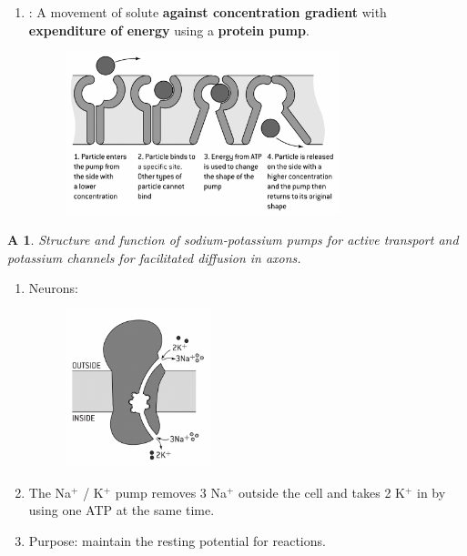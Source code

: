 \documentclass[12pt, a4paper]{article}
\newtheorem{app}{A}[subsection]
\begin{document}
\begin{enumerate}
\begin{itemize}
\begin{figure}[H]
        \end{figure}
    \end{itemize}
    \item \textbf{\color{red}{Active transport}}: A movement of solute \textbf{against concentration gradient} with \textbf{expenditure of energy} using a \textbf{protein pump}. 
    \begin{figure}[H]
            \center
            \includegraphics[width=0.75\textwidth]{Fig1.13.png}
    \end{figure}
    {\color{blue}{This transport works against the concentration gradient because the molecules are vital to the cells that they cannot afford to lose one (for example, glucose for animal cells and nitrogen for plant cells.)}}
\end{enumerate}
\begin{app}
    Structure and function of sodium-potassium pumps for active transport and potassium channels for facilitated diffusion in axons. 
\end{app}
\begin{enumerate}
    \item Neurons: 
    \begin{figure}[H]
        \center
        \includegraphics[width=0.4\textwidth]{Fig1.14.png}
    \end{figure}
    \item The Na$^+$ / K$^+$ pump removes 3 Na$^+$ outside the cell and takes 2 K$^+$ in by using one ATP at the same time. 
    \item Purpose: maintain the resting potential for reactions. 
\end{enumerate}
\end{document}
